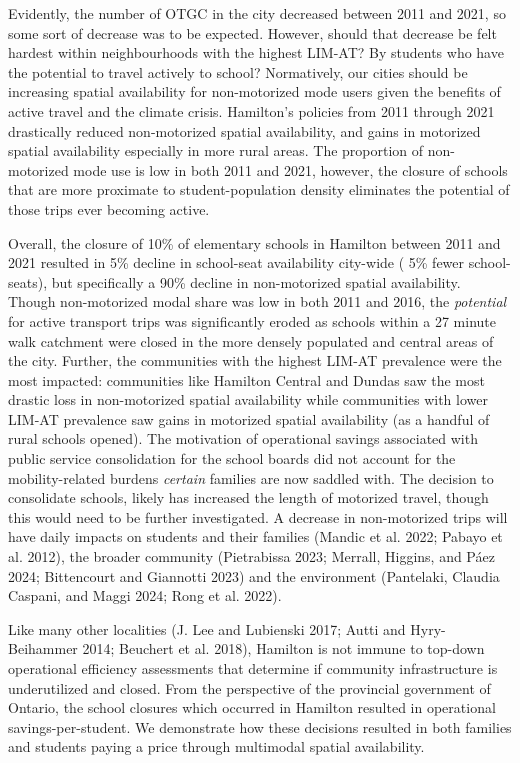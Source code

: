 \documentclass[
default
]{sn-jnl}
\begin{document}
Evidently, the number of OTGC in the city decreased between 2011 and
2021, so some sort of decrease was to be expected. However, should that
decrease be felt hardest within neighbourhoods with the highest LIM-AT?
By students who have the potential to travel actively to school?
Normatively, our cities should be increasing spatial availability for
non-motorized mode users given the benefits of active travel and the
climate crisis. Hamilton's policies from 2011 through 2021 drastically
reduced non-motorized spatial availability, and gains in motorized
spatial availability especially in more rural areas. The proportion of
non-motorized mode use is low in both 2011 and 2021, however, the
closure of schools that are more proximate to student-population density
eliminates the potential of those trips ever becoming active.

Overall, the closure of 10\% of elementary schools in Hamilton between
2011 and 2021 resulted in 5\% decline in school-seat availability
city-wide ( 5\% fewer school-seats), but specifically a 90\% decline in
non-motorized spatial availability. Though non-motorized modal share was
low in both 2011 and 2016, the \emph{potential} for active transport
trips was significantly eroded as schools within a 27 minute walk
catchment were closed in the more densely populated and central areas of
the city. Further, the communities with the highest LIM-AT prevalence
were the most impacted: communities like Hamilton Central and Dundas saw
the most drastic loss in non-motorized spatial availability while
communities with lower LIM-AT prevalence saw gains in motorized spatial
availability (as a handful of rural schools opened). The motivation of
operational savings associated with public service consolidation for the
school boards did not account for the mobility-related burdens
\emph{certain} families are now saddled with. The decision to
consolidate schools, likely has increased the length of motorized
travel, though this would need to be further investigated. A decrease in
non-motorized trips will have daily impacts on students and their
families (Mandic et al. 2022; Pabayo et al. 2012), the broader community
(Pietrabissa 2023; Merrall, Higgins, and Páez 2024; Bittencourt and
Giannotti 2023) and the environment (Pantelaki, Claudia Caspani, and
Maggi 2024; Rong et al. 2022).

Like many other localities (J. Lee and Lubienski 2017; Autti and
Hyry-Beihammer 2014; Beuchert et al. 2018), Hamilton is not immune to
top-down operational efficiency assessments that determine if community
infrastructure is underutilized and closed. From the perspective of the
provincial government of Ontario, the school closures which occurred in
Hamilton resulted in operational savings-per-student. We demonstrate how
these decisions resulted in both families and students paying a price
through multimodal spatial availability.
\end{document}
